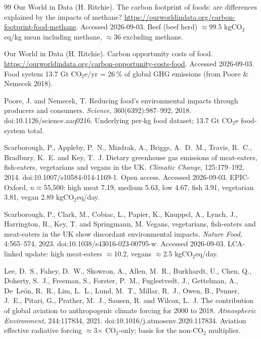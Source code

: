 \documentclass[11pt,a4paper]{article}
\begin{document}
\begin{thebibliography}{99}
Our World in Data (H. Ritchie). The carbon footprint of foods: are differences explained by the impacts of methane?
\url{https://ourworldindata.org/carbon-footprint-food-methane}. Accessed 2026-09-03.
Beef (beef herd) $\approx$99.5 kgCO$_2$eq/kg mean including methane, $\approx$36 excluding methane.

Our World in Data (H. Ritchie). Carbon opportunity costs of food.
\url{https://ourworldindata.org/carbon-opportunity-costs-food}. Accessed 2026-09-03.
Food system 13.7 Gt CO$_2$e/yr = 26\,\% of global GHG emissions (from Poore \& Nemecek 2018).

Poore, J. and Nemecek, T. Reducing food's environmental impacts through producers and consumers.
\textit{Science}, 360(6392):987--992, 2018. doi:10.1126/science.aaq0216.
Underlying per-kg food dataset; 13.7 Gt CO$_2$e food-system total.

Scarborough, P., Appleby, P.~N., Mizdrak, A., Briggs, A.~D.~M., Travis, R.~C., Bradbury, K.~E. and Key, T.~J.
Dietary greenhouse gas emissions of meat-eaters, fish-eaters, vegetarians and vegans in the UK.
\textit{Climatic Change}, 125:179--192, 2014. doi:10.1007/s10584-014-1169-1. Open access. Accessed 2026-09-03.
EPIC-Oxford, $n\approx$55{,}500: high meat 7.19, medium 5.63, low 4.67, fish 3.91, vegetarian 3.81, vegan 2.89 kgCO$_2$eq/day.

Scarborough, P., Clark, M., Cobiac, L., Papier, K., Knuppel, A., Lynch, J., Harrington, R., Key, T. and Springmann, M.
Vegans, vegetarians, fish-eaters and meat-eaters in the UK show discordant environmental impacts.
\textit{Nature Food}, 4:565--574, 2023. doi:10.1038/s43016-023-00795-w. Accessed 2026-09-03.
LCA-linked update: high meat-eaters $\approx$10.2, vegans $\approx$2.5 kgCO$_2$eq/day.

Lee, D.~S., Fahey, D.~W., Skowron, A., Allen, M.~R., Burkhardt, U., Chen, Q., Doherty, S.~J., Freeman, S., Forster, P.~M., Fuglestvedt, J., Gettelman, A., De~Le\'on, R.~R., Lim, L.~L., Lund, M.~T., Millar, R.~J., Owen, B., Penner, J.~E., Pitari, G., Prather, M.~J., Sausen, R. and Wilcox, L.~J.
The contribution of global aviation to anthropogenic climate forcing for 2000 to 2018.
\textit{Atmospheric Environment}, 244:117834, 2021. doi:10.1016/j.atmosenv.2020.117834.
Aviation effective radiative forcing $\approx$3$\times$ CO$_2$-only; basis for the non-CO$_2$ multiplier.


\end{thebibliography}
\end{document}
